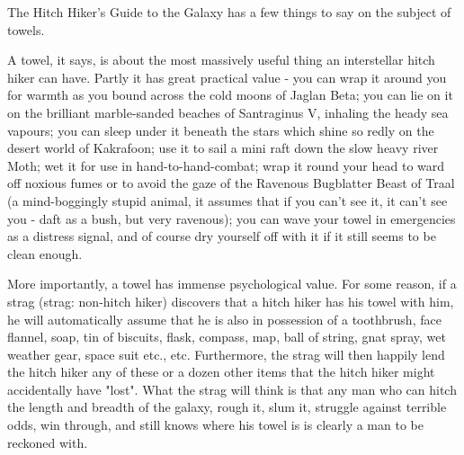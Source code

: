 \documentclass[12pt]{book}
\renewcommand{\indent}{\hspace{1cm}}
\begin{document}
\bigskip
\begin{linenumbers*}
\modulolinenumbers[5]
\indent The Hitch Hiker's Guide to the Galaxy has a few things to say on the subject of towels. 

\indent A towel, it says, is about the most massively useful thing an interstellar hitch hiker can have. Partly it has great practical value - you can wrap it around you for warmth as you bound across the cold moons of Jaglan Beta; you can lie on it on the brilliant marble-sanded beaches of Santraginus V, inhaling the heady sea vapours; you can sleep under it beneath the stars which shine so redly on the desert world of Kakrafoon; use it to sail a mini raft down the slow heavy river Moth; wet it for use in hand-to-hand-combat; wrap it round your head to ward off noxious fumes or to avoid the gaze of the Ravenous Bugblatter Beast of Traal (a mind-boggingly stupid animal, it assumes that if you can't see it, it can't see you - daft as a bush, but very ravenous); you can wave your towel in emergencies as a distress signal, and of course dry yourself off with it if it still seems to be clean enough.

\indent More importantly, a towel has immense psychological value. For some reason, if a strag (strag: non-hitch hiker) discovers that a hitch hiker has his towel with him, he will automatically assume that he is also in possession of a toothbrush, face flannel, soap, tin of biscuits, flask, compass, map, ball of string, gnat spray, wet weather gear, space suit etc., etc. Furthermore, the strag will then happily lend the hitch hiker any of these or a dozen other items that the hitch hiker might accidentally have "lost". What the strag will think is that any man who can hitch the length and breadth of the galaxy, rough it, slum it, struggle against terrible odds, win through, and still knows where his towel is is clearly a man to be reckoned with.
\end{linenumbers*}
\end{document}
